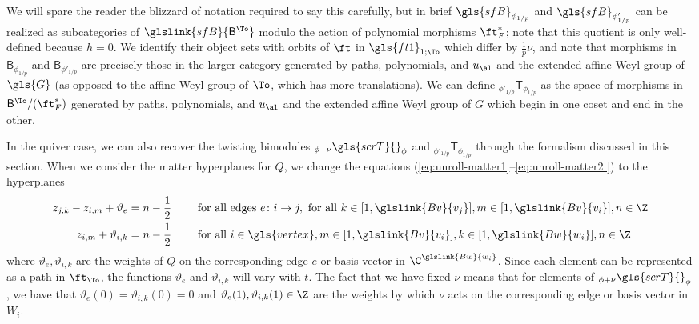 We will spare the reader the blizzard of notation required to say this
carefully, but in brief $\gls{sfB}_{\phi_{1/p}}$ and
$\gls{sfB}_{\phi'_{1/p}}$ can be realized as subcategories of $\glslink{sfB}{\mathsf{B}
^{\To}}$ modulo the action of polynomial morphisms $\ft_F^*$; note that
this quotient is only well-defined because $h=0$.  We identify their
object sets with orbits of $\ft$ in $\gls{ft1}_{1;\To}$ which differ
by $\frac{1}{p}\nu$, and note that morphisms in $\mathsf{B}_{\phi_{1/p}}$ and
$\mathsf{B}_{\phi'_{1/p}}$ are precisely those in the larger category
generated by paths, polynomials, and $u_{\al}$ and the extended affine
Weyl group of $\gls{G}$ (as opposed to the affine Weyl group of $\To$, which
has more translations).  We can define
${}_{\phi'_{1/p}}\mathsf{T}_{\phi_{1/p}}$ as the space of morphisms in $\mathsf{B}
^{\To}/(\ft_F^*)$ generated by paths, polynomials, and $u_{\al}$ and the extended affine
Weyl group of $G$ which begin in one coset and end in the other.  

In the quiver case, we can also recover the twisting bimodules
${}_{\phi+\nu}\gls{scrT}{}_{\phi}$  and  ${}_{\phi'_{1/p}}\mathsf{T}_{\phi_{1/p}}$ through
the formalism discussed in this section. 
When we consider the matter hyperplanes for $Q$, we change the equations
(\ref{eq:unroll-matter1}--\ref{eq:unroll-matter2   }) to the
hyperplanes\begin{align*}
z_{j,k}-z_{i,m}+\vartheta_{e}&=n-\frac{1}{2}\qquad \text{ for all edges }
                               e\colon i\to j,
  \text{ for all } k\in [1,\glslink{Bv}{v_j}], m\in [1,\glslink{Bv}{v_i}], n\in \Z\\
z_{i,m}+\vartheta_{i,k}&=n-\frac{1}{2}\qquad \text{ for all } i\in
                                 {\gls{vertex}}, m\in [1,\glslink{Bv}{v_i}], k\in [1,\glslink{Bw}{w_i}], n\in \Z%
\end{align*} where $\vartheta_e,\vartheta_{i,k}$ are the weights of
$Q$ on the corresponding edge $e$ or basis vector in $\C^{\glslink{Bw}{w_i}}$.   Since each element can be represented as a path in $\ft_{\To}$, the functions $\vartheta_e$ and 
$\vartheta_{i,k}$ will vary with $t$.  The fact that we have fixed $\nu$
means that for elements of ${}_{\phi+\nu}\gls{scrT}{}_{\phi}$, we have that $\vartheta_e(0)=\vartheta_{i,k}(0)=0$ and
$\vartheta_e(1), \vartheta_{i,k}(1)\in \Z$ are the weights by which $\nu$ acts on the corresponding edge or basis vector in $W_i$.

